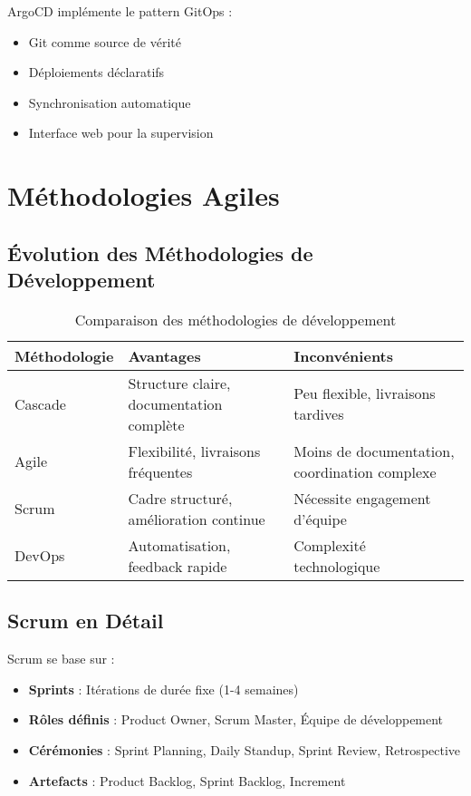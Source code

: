 ArgoCD implémente le pattern GitOps :
\begin{itemize}
    \item Git comme source de vérité
    \item Déploiements déclaratifs
    \item Synchronisation automatique
    \item Interface web pour la supervision
\end{itemize}

\section{Méthodologies Agiles}

\subsection{Évolution des Méthodologies de Développement}

\begin{table}[H]
    \centering
    \begin{tabularx}{\textwidth}{|X|X|X|}
        \hline
        \textbf{Méthodologie} & \textbf{Avantages} & \textbf{Inconvénients} \\
        \hline
        Cascade & Structure claire, documentation complète & Peu flexible, livraisons tardives \\
        \hline
        Agile & Flexibilité, livraisons fréquentes & Moins de documentation, coordination complexe \\
        \hline
        Scrum & Cadre structuré, amélioration continue & Nécessite engagement d'équipe \\
        \hline
        DevOps & Automatisation, feedback rapide & Complexité technologique \\
        \hline
    \end{tabularx}
    \caption{Comparaison des méthodologies de développement}
    \label{tab:methodologies_comparison}
\end{table}

\subsection{Scrum en Détail}

Scrum se base sur :
\begin{itemize}
    \item \textbf{Sprints} : Itérations de durée fixe (1-4 semaines)
    \item \textbf{Rôles définis} : Product Owner, Scrum Master, Équipe de développement
    \item \textbf{Cérémonies} : Sprint Planning, Daily Standup, Sprint Review, Retrospective
    \item \textbf{Artefacts} : Product Backlog, Sprint Backlog, Increment
\end{itemize}

